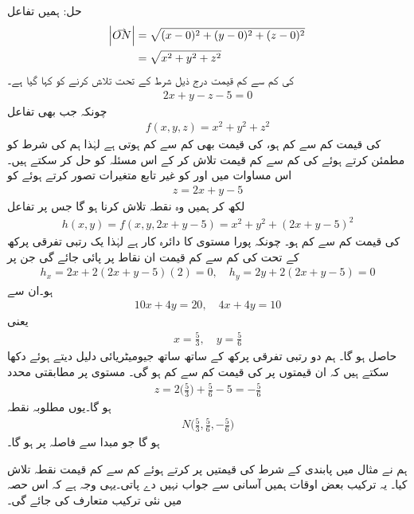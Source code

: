 حل:\quad
ہمیں  تفاعل 
\begin{align*}
\abs{\krightharpoonup{ON}}&=\sqrt{(x-0)^2+(y-0)^2+(z-0)^2}\\
&=\sqrt{x^2+y^2+z^2}
\end{align*}
کی کم سے کم قیمت درج ذیل شرط  کے تحت    تلاش کرنے کو کہا گیا ہے۔
\begin{align*}
2x+y-z-5=0
\end{align*}
چونکہ  جب بھی تفاعل
\begin{align*}
f(x,y,z)=x^2+y^2+z^2
\end{align*}
کی قیمت کم سے کم ہو،  کی قیمت بھی کم سے کم ہوتی ہے لہٰذا  ہم   کی شرط کو مطمئن کرتے   ہوئے  کی کم سے کم قیمت تلاش کر کے  اس مسئلہ کو  حل کر سکتے ہیں۔   اس مساوات میں  اور  کو غیر تابع متغیرات تصور کرتے ہوئے   کو
\begin{align*}
z=2x+y-5
\end{align*}
لکھ کر ہمیں وہ نقطہ  تلاش کرنا ہو گا جس پر تفاعل
\begin{align*}
h(x,y)=f(x,y,2x+y-5)=x^2+y^2+(2x+y-5)^2
\end{align*}
کی قیمت کم سے کم ہو۔ چونکہ پورا  مستوی  کا دائرہ کار ہے لہٰذا  یک رتبی تفرقی پرکھ کے تحت  کی کم سے کم قیمت ان نقاط پر پائی جائے گی جن پر
\begin{align*}
h_x=2x+2(2x+y-5)(2)=0,\quad h_y=2y+2(2x+y-5)=0
\end{align*}
ہو۔ان سے
\begin{align*}
10x+4y=20,\quad 4x+4y=10
\end{align*}
یعنی
\begin{align*}
x=\frac{5}{3},\quad y=\frac{5}{6}
\end{align*}
حاصل ہو گا۔ ہم دو رتبی تفرقی پرکھ کے ساتھ ساتھ جیومیٹریائی دلیل  دیتے ہوئے  دکھا سکتے ہیں کہ ان قیمتوں پر  کی قیمت کم سے کم ہو گی۔ مستوی  پر مطابقتی  محدد
\begin{align*}
z=2\big(\frac{5}{3}\big)+\frac{5}{6}-5=-\frac{5}{6}
\end{align*}
ہو گا۔یوں  مطلوبہ  نقطہ
\begin{align*}
N\big(\frac{5}{3},\frac{5}{6},-\frac{5}{6}\big)
\end{align*}
ہو گا جو مبدا سے  فاصلہ  پر ہو گا۔

ہم نے  مثال  میں       پابندی کے شرط کی قیمتیں پر کرتے ہوئے کم سے کم قیمت نقطہ تلاش کیا۔ یہ ترکیب بعض اوقات ہمیں آسانی  سے  جواب نہیں دے پاتی۔یہی وجہ ہے کہ اس حصہ میں نئی ترکیب متعارف کی جائے گی۔


